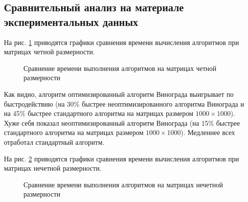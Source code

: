 \documentclass[a4paper,12pt]{article}
\begin{document}
    
    \subsection{Сравнительный анализ на материале экспериментальных данных}
        На рис. \ref{fig:gtaf_1} приводятся графики сравнения времени вычисления алгоритмов при матрицах четной размерности.
        
        \begin{figure}[h!]
            \caption{Сравнение времени выполнения алгоритмов на матрицах четной размерности}
            \label{fig:gtaf_1}
        \end{figure}
        
        Как видно, алгоритм оптимизированный алгоритм Винограда выигрывает по быстродействию (на 30\% быстрее неоптимизированного алгоритма Винограда и на 45\% быстрее стандартного алгоритма на матрицах размером $1000 \times 1000$). Хуже себя показал неоптимизированный алгоритм Винограда (на 15\% быстрее стандартного алгоритма на матрицах размером $1000 \times 1000$). Медленнее всех отработал стандартный алгоритм.
        
         На рис. \ref{fig:graf_2} приводятся графики сравнения времени вычисления алгоритмов при матрицах нечетной размерности.
         
        \begin{figure}[h!]
            \caption{Сравнение времени выполнения алгоритмов на матрицах нечетной размерности}
            \label{fig:graf_2}
        \end{figure}
        
\end{document}
